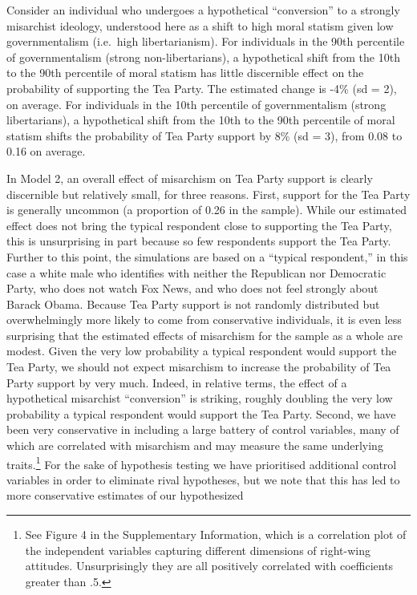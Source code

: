 \documentclass[12pt,]{article}
\let\rmarkdownfootnote\footnote%
\def\footnote{\protect\rmarkdownfootnote}
\begin{document}
Consider an individual who undergoes a hypothetical ``conversion'' to a
strongly misarchist ideology, understood here as a shift to high moral
statism given low governmentalism (i.e.~high libertarianism). For
individuals in the 90th percentile of governmentalism (strong
non-libertarians), a hypothetical shift from the 10th to the 90th
percentile of moral statism has little discernible effect on the
probability of supporting the Tea Party. The estimated change is -4\%
(sd = 2), on average. For individuals in the 10th percentile of
governmentalism (strong libertarians), a hypothetical shift from the
10th to the 90th percentile of moral statism shifts the probability of
Tea Party support by 8\% (sd = 3), from 0.08 to 0.16 on average.

In Model 2, an overall effect of misarchism on Tea Party support is
clearly discernible but relatively small, for three reasons. First,
support for the Tea Party is generally uncommon (a proportion of 0.26 in
the sample). While our estimated effect does not bring the typical
respondent close to supporting the Tea Party, this is unsurprising in
part because so few respondents support the Tea Party. Further to this
point, the simulations are based on a ``typical respondent,'' in this
case a white male who identifies with neither the Republican nor
Democratic Party, who does not watch Fox News, and who does not feel
strongly about Barack Obama. Because Tea Party support is not randomly
distributed but overwhelmingly more likely to come from conservative
individuals, it is even less surprising that the estimated effects of
misarchism for the sample as a whole are modest. Given the very low
probability a typical respondent would support the Tea Party, we should
not expect misarchism to increase the probability of Tea Party support
by very much. Indeed, in relative terms, the effect of a hypothetical
misarchist ``conversion'' is striking, roughly doubling the very low
probability a typical respondent would support the Tea Party. Second, we
have been very conservative in including a large battery of control
variables, many of which are correlated with misarchism and may measure
the same underlying
traits.\footnote{See Figure 4 in the Supplementary Information, which is a correlation plot of the independent variables capturing different dimensions of right-wing attitudes. Unsurprisingly they are all positively correlated with coefficients greater than .5.}
For the sake of hypothesis testing we have prioritised additional
control variables in order to eliminate rival hypotheses, but we note
that this has led to more conservative estimates of our hypothesized
\end{document}
